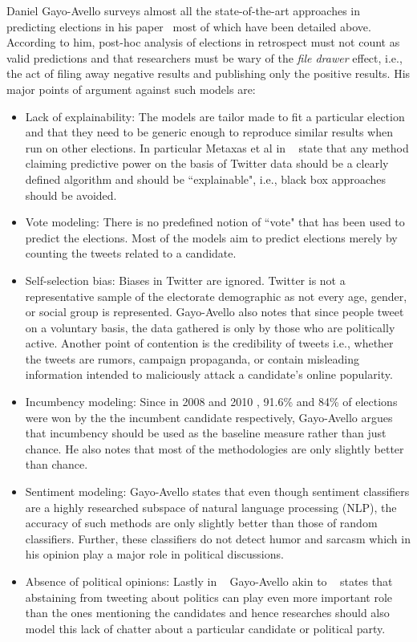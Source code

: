 Daniel Gayo-Avello surveys almost all the state-of-the-art approaches in predicting elections in his paper~\cite{gayo2012wanted} most of which have been detailed above.
According to him, post-hoc analysis of elections in retrospect must not count as valid predictions and that researchers 
must be wary of the \emph{file drawer} effect, i.e., the act of filing away negative results and publishing only the positive results.
His major points of argument against such models are:
\begin{itemize}
\item
Lack of explainability:
The models are tailor made to fit a particular election and that they need to be generic enough to reproduce similar results when run on other elections.
In particular Metaxas et al in ~\cite{metaxas2011not} state that any method claiming predictive power on the basis of Twitter data should be a clearly defined algorithm and should be ``explainable", i.e., black box approaches should be avoided.
\item
Vote modeling:
There is no predefined notion of ``vote" that has been used to predict the elections.
Most of the models aim to predict elections merely by counting the tweets related to a candidate.
\item
Self-selection bias:
Biases in Twitter are ignored. Twitter is not a representative sample of the electorate demographic as not every age, 
gender, or social group is represented.
Gayo-Avello
also notes that since people tweet on a voluntary basis, the data gathered is only by those who are politically active. 
Another point of contention is the credibility of tweets i.e., whether the tweets are rumors, campaign propaganda, 
or contain misleading information intended to maliciously attack a candidate's online popularity.
\item
Incumbency modeling:
Since in 2008 and 2010 , 91.6\% and 84\% of elections were won by the the incumbent candidate respectively, 
Gayo-Avello argues that incumbency should be used as the baseline measure rather than just chance.
He also notes that most of the methodologies are only slightly better than chance.
\item
Sentiment modeling:
Gayo-Avello states that
even though sentiment classifiers are a highly researched subspace of natural language processing (NLP), the 
accuracy of such methods are only slightly better than those of random classifiers. 
Further, these classifiers do not detect humor and sarcasm which in his opinion play a major role in political discussions.
\item
Absence of political opinions:
Lastly in ~\cite{gayo2011don} Gayo-Avello akin to ~\cite{mustafaraj2011vocal} states that abstaining from tweeting about politics can play even more important role than the ones mentioning the candidates and hence researches should also model this lack of chatter about a particular candidate or political party.
\end{itemize}

